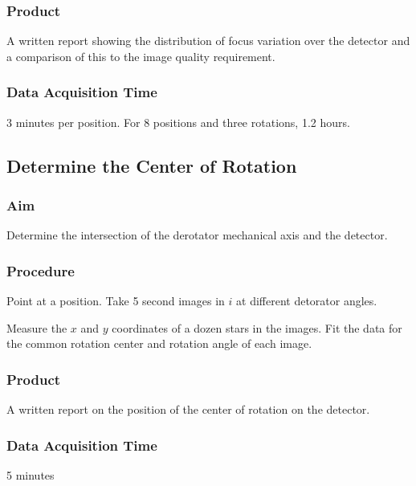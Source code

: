 \documentclass{article}
\begin{document}
\subsubsection{Product}

A written report showing the distribution of focus variation over the detector and a comparison of this to the image quality requirement.

\subsubsection{Data Acquisition Time}

3 minutes per position. For 8 positions and three rotations, 1.2 hours.


\subsection{Determine the Center of Rotation}

\subsubsection{Aim}

Determine the intersection of the derotator mechanical axis and the detector.

\subsubsection{Procedure}

Point at a position. Take 5 second images in $i$ at different detorator angles.

Measure the $x$ and $y$ coordinates of a dozen stars in the images. Fit the data for the common rotation center and rotation angle of each image.

\subsubsection{Product}

A written report on the position of the center of rotation on the detector.

\subsubsection{Data Acquisition Time}

5 minutes
\end{document}
